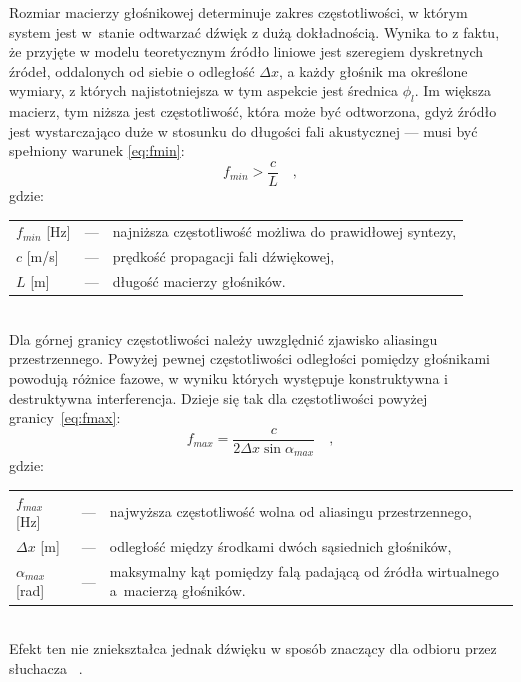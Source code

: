 \documentclass[12pt]{oska}
\begin{document}
Rozmiar macierzy głośnikowej determinuje zakres częstotliwości, w którym system
jest w~stanie odtwarzać dźwięk z dużą dokładnością. Wynika to z faktu, że
przyjęte w modelu teoretycznym źródło liniowe jest szeregiem
dyskretnych źródeł, oddalonych od siebie o odległość $\Delta x$, a każdy
głośnik ma określone wymiary, z których najistotniejsza w tym aspekcie jest
średnica $\phi_l$. Im większa macierz, tym niższa jest częstotliwość, która może
być odtworzona, gdyż źródło jest wystarczająco duże w stosunku do długości fali
akustycznej --- musi być spełniony warunek \eqref{eq:fmin}:
\begin{equation}
  f_{min}>\frac{c}{L} \quad,	\label{eq:fmin}
\end{equation}
gdzie:\\
\indent \begin{tabular}{l c l}
  $f_{min}$ [\si{\hertz}] & --- & najniższa częstotliwość możliwa do prawidłowej syntezy, \\
  $c$ [\si[per-mode=symbol]{\metre\per\second}] & --- & prędkość propagacji fali dźwiękowej, \\
  $L$ [\si{\metre}] & --- & długość macierzy głośników. \\
\end{tabular}\\

Dla górnej granicy częstotliwości należy uwzględnić zjawisko aliasingu
przestrzennego. Powyżej pewnej częstotliwości odległości pomiędzy głośnikami
powodują różnice fazowe, w wyniku których występuje konstruktywna i
destruktywna interferencja. Dzieje się tak dla częstotliwości powyżej
granicy~\eqref{eq:fmax}:
\begin{equation}
  f_{max}=\frac{c}{2\Delta x \sin{\alpha_{max}}} \quad, \label{eq:fmax}
\end{equation}
gdzie:\\
\indent \begin{tabular}{l c p{}}
  $f_{max}$ [\si{\hertz}] & --- & najwyższa częstotliwość wolna od aliasingu przestrzennego, \\
  $\Delta x$ [\si{\metre}] & --- & odległość między środkami dwóch sąsiednich głośników, \\
  $\alpha_{max}$ [\si{\radian}] & --- & maksymalny kąt pomiędzy falą padającą od źródła wirtualnego a~macierzą głośników.\\
\end{tabular}\\

\noindent Efekt ten nie zniekształca jednak dźwięku w sposób znaczący dla odbioru przez słuchacza
~\cite{hq_rendering}.
\end{document}
